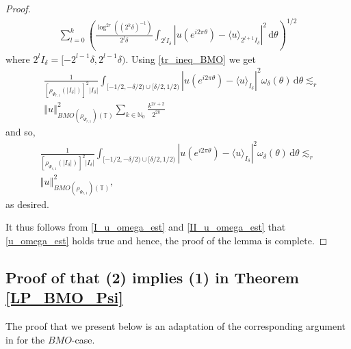 \documentclass[a4paper, leqno, 10pt]{amsart}
\numberwithin{equation}{section}
\newcommand{\dd}{\mathrm{d}}
\newcommand{\T}{\mathbb{T}}
\newcommand{\norm}[1]{\left\Vert#1\right\Vert}
\newcommand{\N}{\mathbb{N}}
\begin{document}
\begin{proof}
\begin{align*}
\sum_{l=0}^k \left( \frac{\log^{2r} \left( (2^k \delta)^{-1} \right)} { 2^l \delta } \int_{ 2^l I_{\delta} } | u ( e^{i 2 \pi \theta} ) - \langle u \rangle_{2^{l+1} I_{\delta}} |^2 \, \dd \theta \right)^{1/2}
\end{align*}
where $2^l I_{\delta} = [- 2^{l-1} \delta, 2^{l-1} \delta)$. Using \eqref{tr_ineq_BMO} we get
\begin{align*}
&\frac{1} { \left[ \rho_{\Psi_{r,1}} (|I_{\delta}|) \right]^2 |I_{\delta}|} \int_{[- 1/2, - \delta/2) \cup [\delta/2, 1/2)} | u ( e^{i 2 \pi \theta} ) - \langle u \rangle_{I_{\delta}} |^2 \omega_{\delta} ( \theta ) \, \dd \theta  \lesssim_r  \\ 
& \norm{ u }^2_{BMO (\rho_{\Psi_{r,1}}) (\T)} \sum_{k \in \N_0 }  \frac{k^{2r+2}} { 2^{2k} }
\end{align*}
and so,
\begin{multline}\label{II_u_omega_est}
\frac{1} { \left[ \rho_{\Psi_{r,1}} (|I_{\delta}|) \right]^2 |I_{\delta}|} \int_{ [- 1/2, - \delta/2) \cup [\delta/2, 1/2) } | u ( e^{i 2 \pi \theta} ) - \langle u \rangle_{I_{\delta}} |^2 \omega_{\delta} ( \theta ) \, \dd \theta  \lesssim_r \\ \norm{ u }^2_{BMO (\rho_{\Psi_{r,1}}) (\T)} ,
\end{multline}
as desired.

It thus follows from \eqref{I_u_omega_est} and \eqref{II_u_omega_est} that \eqref{u_omega_est} holds true and hence, the proof of the lemma is complete.
\end{proof}

%
\subsection{Proof of that (2) implies (1) in Theorem \ref{LP_BMO_Psi}}\label{2_implies_1}
%
The proof that we present below is an adaptation of the corresponding argument in \cite{V-T} for the $BMO$-case.
\end{document}

